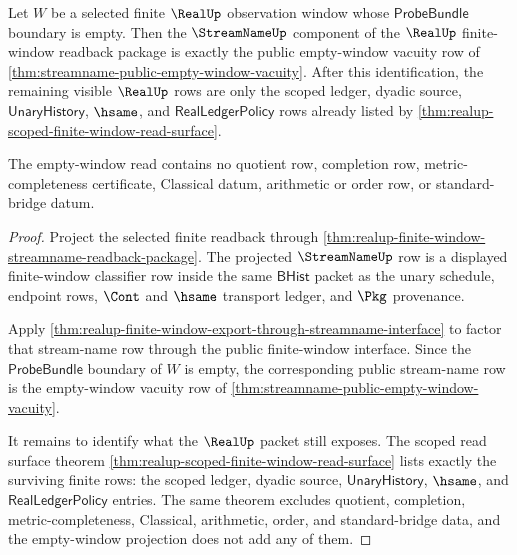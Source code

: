 \begin{theorem}
\label{thm:realup-empty-window-streamname-boundary}
Let $W$ be a selected finite $\RealUp$ observation window whose
$\mathsf{ProbeBundle}$ boundary is empty. Then the $\StreamNameUp$ component of
the $\RealUp$ finite-window readback package is exactly the public empty-window
vacuity row of \autoref{thm:streamname-public-empty-window-vacuity}. After this
identification, the remaining visible $\RealUp$ rows are only the scoped ledger,
dyadic source, $\mathsf{UnaryHistory}$, $\hsame$, and
$\mathsf{RealLedgerPolicy}$ rows already listed by
\autoref{thm:realup-scoped-finite-window-read-surface}.

The empty-window read contains no quotient row, completion row,
metric-completeness certificate, Classical datum, arithmetic or order row, or
standard-bridge datum.
\end{theorem}
\begin{proof}
Project the selected finite readback through
\autoref{thm:realup-finite-window-streamname-readback-package}. The projected
$\StreamNameUp$ row is a displayed finite-window classifier row inside the same
$\mathsf{BHist}$ packet as the unary schedule, endpoint rows, $\Cont$ and
$\hsame$ transport ledger, and $\Pkg$ provenance.

Apply \autoref{thm:realup-finite-window-export-through-streamname-interface} to
factor that stream-name row through the public finite-window interface. Since
the $\mathsf{ProbeBundle}$ boundary of $W$ is empty, the corresponding public
stream-name row is the empty-window vacuity row of
\autoref{thm:streamname-public-empty-window-vacuity}.

It remains to identify what the $\RealUp$ packet still exposes. The scoped read
surface theorem \autoref{thm:realup-scoped-finite-window-read-surface} lists
exactly the surviving finite rows: the scoped ledger, dyadic source,
$\mathsf{UnaryHistory}$, $\hsame$, and $\mathsf{RealLedgerPolicy}$ entries. The
same theorem excludes quotient, completion, metric-completeness, Classical,
arithmetic, order, and standard-bridge data, and the empty-window projection
does not add any of them.
\end{proof}

